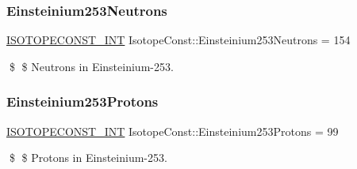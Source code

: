 \subsubsection{\texorpdfstring{Einsteinium253\+Neutrons}{Einsteinium253Neutrons}}
{\footnotesize\ttfamily \mbox{\hyperlink{group___isotope_const-_macros_ga5f18360b3e99483a35c32d789e62621c}{I\+S\+O\+T\+O\+P\+E\+C\+O\+N\+S\+T\+\_\+\+I\+NT}} Isotope\+Const\+::\+Einsteinium253\+Neutrons = 154}

\$ \$ Neutrons in Einsteinium-\/253. \mbox{\label{group___isotope_const-_einsteinium-_es253_ga34cfa2226473631cd3d76ea0cd24fb3c}} 
\subsubsection{\texorpdfstring{Einsteinium253\+Protons}{Einsteinium253Protons}}
{\footnotesize\ttfamily \mbox{\hyperlink{group___isotope_const-_macros_ga5f18360b3e99483a35c32d789e62621c}{I\+S\+O\+T\+O\+P\+E\+C\+O\+N\+S\+T\+\_\+\+I\+NT}} Isotope\+Const\+::\+Einsteinium253\+Protons = 99}

\$ \$ Protons in Einsteinium-\/253. 